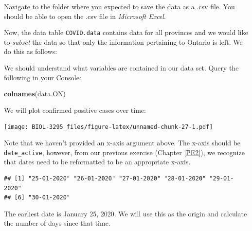 \documentclass[]{book}
\newenvironment{Shaded}{\begin{snugshade}}{\end{snugshade}}
\newcommand{\KeywordTok}[1]{\textcolor[rgb]{0.13,0.29,0.53}{\textbf{{#1}}}}
\newcommand{\DataTypeTok}[1]{\textcolor[rgb]{0.13,0.29,0.53}{{#1}}}
\newcommand{\StringTok}[1]{\textcolor[rgb]{0.31,0.60,0.02}{{#1}}}
\newcommand{\NormalTok}[1]{{#1}}
\begin{document}
Navigate to the folder where you expected to save the data as a .csv
file. You should be able to open the .csv file in \emph{Microsoft
Excel}.

Now, the data table \texttt{COVID.data} contains data for all provinces
and we would like to \emph{subset} the data so that only the information
pertaining to Ontario is left. We do this as follows:

We should understand what variables are contained in our data set. Query
the following in your Console:

\begin{Shaded}
\begin{Highlighting}[]
\KeywordTok{colnames}\NormalTok{(data.ON)}
\end{Highlighting}
\end{Shaded}

We will plot confirmed positive cases over time:

\begin{Shaded}
\end{Shaded}

\texttt{[image: BIOL-3295\_files/figure-latex/unnamed-chunk-27-1.pdf]}

Note that we haven't provided an x-axis argument above. The x-axis
should be \texttt{date\_active}, however, from our previous exercise
(Chapter \ref{PE2}), we recognize that dates need to be reformatted to
be an appropriate x-axis.

\begin{Shaded}
\end{Shaded}

\begin{verbatim}
## [1] "25-01-2020" "26-01-2020" "27-01-2020" "28-01-2020" "29-01-2020"
## [6] "30-01-2020"
\end{verbatim}

The earliest date is January 25, 2020. We will use this as the origin
and calculate the number of days since that time.

\begin{Shaded}
\end{Shaded}
\end{document}
